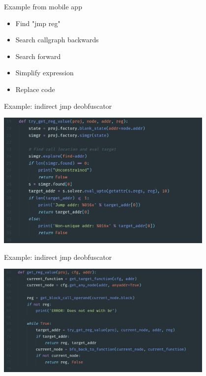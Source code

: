\documentclass[10pt, compress, aspectratio=169]{beamer}
\begin{document}
\begin{frame}{Example from mobile app}
  \begin{itemize}
    \item Find "jmp reg"
    \item Search callgraph backwards
    \item Search forward
    \item Simplify expression
    \item Replace code
  \end{itemize}
\end{frame}

\begin{frame}{Example: indirect jmp deobfuscator}
\begin{center}
  \includegraphics[width=0.8\textwidth]{images/deobf-4-angr1.png}
 \end{center}
\end{frame}

\begin{frame}{Example: indirect jmp deobfuscator}
\begin{center}
  \includegraphics[width=0.8\textwidth]{images/deobf-5-angr2.png}
 \end{center}
\end{frame}
\end{document}
